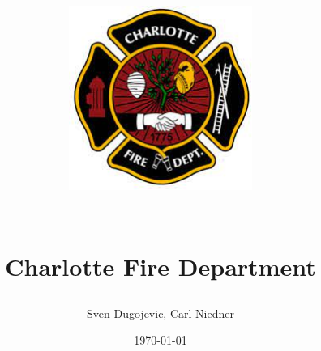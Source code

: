\begin{titlepage}
    \centering
    \title{
        \begin{minipage}{\textwidth}
            \centering
            \includegraphics[height=6cm]{chapters/graphics/Charlotte_Logo.png}
        \end{minipage} \\
        \vspace{1cm}
        Charlotte Fire Department
    }
    \author{Sven Dugojevic, Carl Niedner}
    \date{\today}
    \vspace{3cm}
    \maketitle
    \end{titlepage}
    